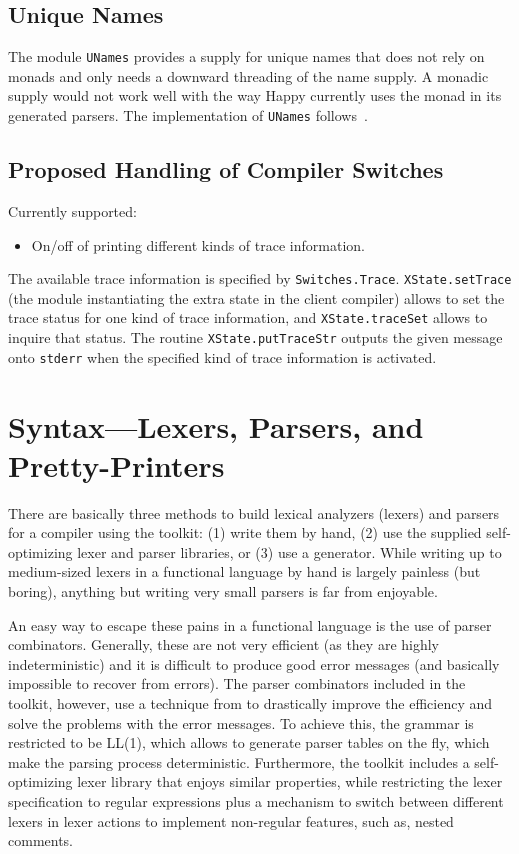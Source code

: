 \documentclass{report}
\newcommand{\code}[1]{\texttt{#1}}
\begin{document}
\section{Unique Names}

The module \code{UNames} provides a supply for unique names that does not rely
on monads and only needs a downward threading of the name supply.  A monadic
supply would not work well with the way Happy currently uses the monad in its
generated parsers.  The implementation of \code{UNames}
follows~\cite{augustsson-etal:gensym}.

\section{Proposed Handling of Compiler Switches}

Currently supported:
%
\begin{itemize}
\item On/off of printing different kinds of trace information.
\end{itemize}

The available trace information is specified by \code{Switches.Trace}.
\code{XState.setTrace} (the module instantiating the extra state in the client
compiler) allows to set the trace status for one kind of trace information,
and \code{XState.traceSet} allows to inquire that status. The routine
\code{XState.putTraceStr} outputs the given message onto \code{stderr} when
the specified kind of trace information is activated.


\chapter{Syntax---Lexers, Parsers, and Pretty-Printers}
\label{cha:syntax}

There are basically three methods to build lexical analyzers (lexers) and
parsers for a compiler using the toolkit: (1) write them by hand, (2) use the
supplied self-optimizing lexer and parser libraries, or (3) use a generator.
While writing up to medium-sized lexers in a functional language by hand is
largely painless (but boring), anything but writing very small parsers is far
from enjoyable.

An easy way to escape these pains in a functional language is the use of
parser combinators.  Generally, these are not very efficient (as they are
highly indeterministic) and it is difficult to produce good error messages
(and basically impossible to recover from errors).  The parser combinators
included in the toolkit, however, use a technique
from  to drastically improve the
efficiency and solve the problems with the error messages.  To achieve this,
the grammar is restricted to be LL(1), which allows to generate parser tables
on the fly, which make the parsing process deterministic.  Furthermore, the
toolkit includes a self-optimizing lexer library that enjoys similar
properties, while restricting the lexer specification to regular expressions
plus a mechanism to switch between different lexers in lexer actions to
implement non-regular features, such as, nested comments.
\end{document}

